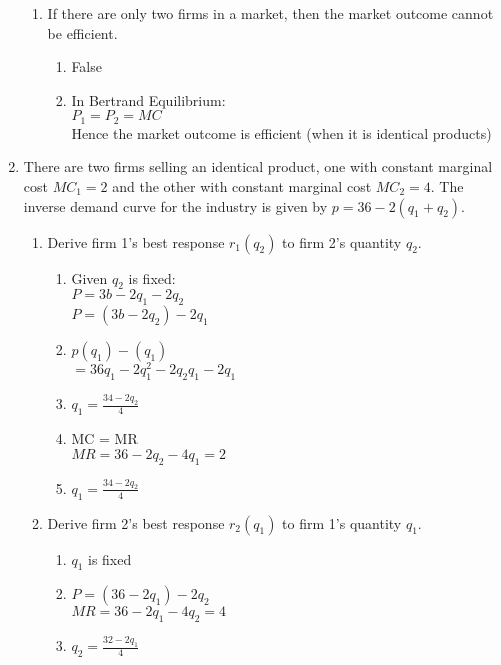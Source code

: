 \documentclass[11pt]{article}
\begin{document}
\begin{enumerate}
\begin{enumerate}
	\item If there are only two firms in a market, then the market outcome cannot be efficient.
    \begin{enumerate}
        \item False
        \item In Bertrand Equilibrium:\\
        $P_1 = P_2 = MC$\\
        Hence the market outcome is efficient (when it is identical products)
    \end{enumerate}
    
	\end{enumerate}
    
    \pagebreak
\item There are two firms selling an identical product, one with constant marginal cost $MC_{1}=2$ and the other with constant marginal cost $MC_{2}=4$. The inverse demand curve for the industry is given by $p=36-2(q_{1}+q_{2})$.
    \begin{enumerate}
        \item Derive firm 1's best response $r_{1}(q_{2})$ to firm 2's quantity $q_{2}$.
        \begin{enumerate}
            \item Given $q_2$ is fixed:\\
            $P = 3b - 2q_1 - 2q_2$\\
             $P = (3b - 2q_2) - 2q_1$
            \item $p (q_1) -(q_1)$\\
            $ = 36q_1 - 2q_1^2 - 2q_2q_1-2q_1$
            \item $q_1 = \frac{34-2q_2}{4}$
            \item MC = MR\\
            $MR = 36 - 2q_2 - 4q_1 = 2$
            \item $q_1 = \frac{34-2q_2}{4}$
            
        \end{enumerate}

        \item Derive firm 2's best response $r_{2}(q_{1})$ to firm 1's quantity $q_{1}$.
        \begin{enumerate}
            \item $q_1$ is fixed
            \item $P = (36-2q_1) - 2q_2$\\
            $MR = 36 - 2q_1 -4q_2 = 4$
            \item $q_2 = \frac{32-2q_1}{4}$
        \end{enumerate}
        

\end{enumerate}
\end{enumerate}
\end{document}
